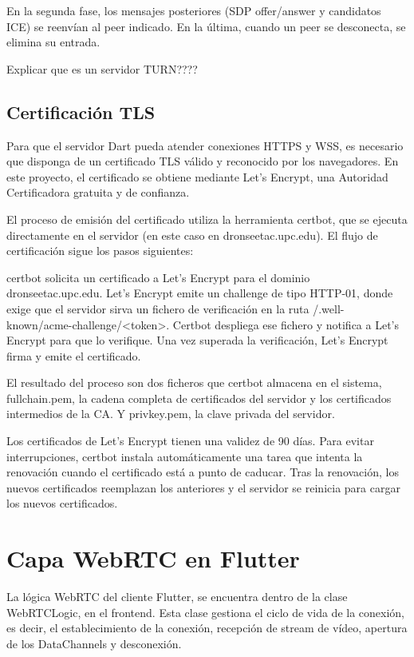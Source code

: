 En la segunda fase, los mensajes posteriores (SDP offer/answer y candidatos ICE) se reenvían al peer indicado. En la última, cuando un peer se desconecta, se elimina su entrada.

Explicar que es un servidor TURN????

\subsection{Certificación TLS}
Para que el servidor Dart pueda atender conexiones HTTPS y WSS, es necesario que disponga de un certificado TLS válido y reconocido por los navegadores. En este proyecto, el certificado se obtiene mediante Let's Encrypt, una Autoridad Certificadora gratuita y de confianza.

El proceso de emisión del certificado utiliza la herramienta certbot, que se ejecuta directamente en el servidor (en este caso en dronseetac.upc.edu). El flujo de certificación sigue los pasos siguientes:

certbot solicita un certificado a Let’s Encrypt para el dominio dronseetac.upc.edu. Let’s Encrypt emite un challenge de tipo HTTP-01, donde exige que el servidor sirva un fichero de verificación en la ruta /.well-known/acme-challenge/<token>. Certbot despliega ese fichero y notifica a Let’s Encrypt para que lo verifique. Una vez superada la verificación, Let’s Encrypt firma y emite el certificado.

El resultado del proceso son dos ficheros que certbot almacena en el sistema, fullchain.pem, la cadena completa de certificados del servidor y los certificados intermedios de la CA. Y privkey.pem, la clave privada del servidor.

Los certificados de Let’s Encrypt tienen una validez de 90 días. Para evitar interrupciones, certbot instala automáticamente una tarea que intenta la renovación cuando el certificado está a punto de caducar. Tras la renovación, los nuevos certificados reemplazan los anteriores y el servidor se reinicia para cargar los nuevos certificados. 

\section{Capa WebRTC en Flutter}
La lógica WebRTC del cliente Flutter, se encuentra dentro de la clase WebRTCLogic, en el frontend. Esta clase gestiona el ciclo de vida de la conexión, es decir, el establecimiento de la conexión, recepción de stream de vídeo, apertura de los DataChannels y desconexión.

